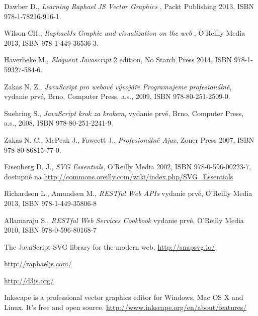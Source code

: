 \begin{thebibliography}{99}                                \label{literatura}




Dawber D.,
{\it Learning Raphael JS Vector Graphics }, 
 Packt Publishing 2013, ISBN 978-1-78216-916-1.
         
 
 
 Wilson CH., {\it RaphaelJs Graphic and visualization on the web} , 
O'Reilly Media 2013, ISBN 978-1-449-36536-3.
         

Haverbeke M., 
{\it Eloquent Javascript} 2 edition, No Starch Press 2014, ISBN 978-1-59327-584-6.


Zakas N. Z., 
{\it JavaScript pro webové vývojáře Programujeme profesionálně},
 vydanie prvé, Brno, Computer Press, a.s., 2009,  ISBN 978-80-251-2509-0.

Suehring S., 
{\it JavaScript krok za krokem},
vydanie prvé, Brno, Computer Press, a.s., 2008, ISBN 978-80-251-2241-9.

Zakas N. C., McPeak J., Fawcett J.,
{\it Profesionálně Ajax},
Zoner Press 2007,  ISBN 978-80-86815-77-0.

Eisenberg D. J., {\it SVG Essentials}, 
O'Reilly Media 2002, ISBN  978-0-596-00223-7,  dostupné na \url{http://commons.oreilly.com/wiki/index.php/SVG_Essentials}

Richardson L., Amundsen M., {\it RESTful Web APIs} 
vydanie prvé, O'Reilly Media 2013, 
ISBN 978-1-449-35806-8

Allamaraju S., {\it RESTful Web Services Cookbook} 
vydanie prvé, O'Reilly Media 2010, 
ISBN 978-0-596-80168-7

The JavaScript SVG library for the modern web,
\url{http://snapsvg.io/}.



\url{ http://raphaeljs.com/}

\url {http://d3js.org/}


Inkscape is a professional vector graphics editor for Windows, Mac OS X and Linux. It's free and open source.
\url {http://www.inkscape.org/en/about/features/}

\end{thebibliography}